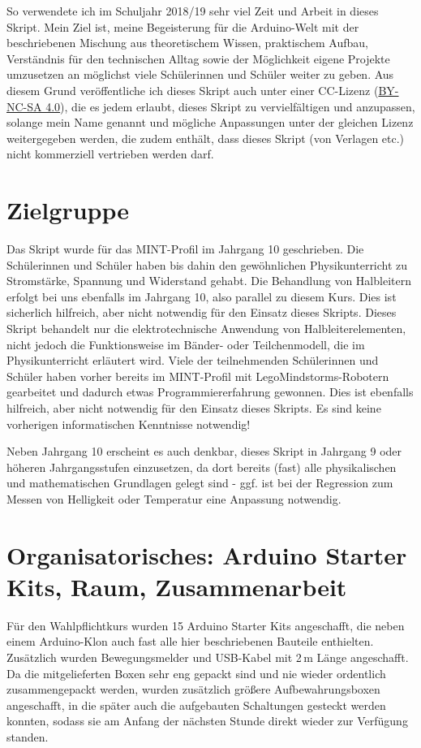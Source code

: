 So verwendete ich im Schuljahr 2018/19 sehr viel Zeit und Arbeit in dieses Skript. Mein Ziel ist, meine Begeisterung für die Arduino-Welt mit der beschriebenen Mischung aus theoretischem Wissen, praktischem Aufbau, Verständnis für den technischen Alltag sowie der Möglichkeit eigene Projekte umzusetzen an möglichst viele Schülerinnen und Schüler weiter zu geben. Aus diesem Grund veröffentliche ich dieses Skript auch unter einer CC-Lizenz (\href{https://creativecommons.org/licenses/by-nc-sa/4.0/deed.de}{BY-NC-SA 4.0}), die es jedem erlaubt, dieses Skript zu vervielfältigen und anzupassen, solange mein Name genannt und mögliche Anpassungen unter der gleichen Lizenz weitergegeben werden, die zudem enthält, dass dieses Skript (von Verlagen etc.) nicht kommerziell vertrieben werden darf.

\section{Zielgruppe}

Das Skript wurde für das MINT-Profil im Jahrgang 10 geschrieben. Die Schülerinnen und Schüler haben bis dahin den gewöhnlichen Physikunterricht zu Stromstärke, Spannung und Widerstand gehabt. Die Behandlung von Halbleitern erfolgt bei uns ebenfalls im Jahrgang 10, also parallel zu diesem Kurs. Dies ist sicherlich hilfreich, aber nicht notwendig für den Einsatz dieses Skripts. Dieses Skript behandelt nur die elektrotechnische Anwendung von Halbleiterelementen, nicht jedoch die Funktionsweise im Bänder- oder Teilchenmodell, die im Physikunterricht erläutert wird. Viele der teilnehmenden Schülerinnen und Schüler haben vorher bereits im MINT-Profil mit LegoMindstorms-Robotern gearbeitet und dadurch etwas Programmiererfahrung gewonnen. Dies ist ebenfalls hilfreich, aber nicht notwendig für den Einsatz dieses Skripts. Es sind keine vorherigen informatischen Kenntnisse notwendig!

Neben Jahrgang 10 erscheint es auch denkbar, dieses Skript in Jahrgang 9 oder höheren Jahrgangsstufen einzusetzen, da dort bereits (fast) alle physikalischen und mathematischen Grundlagen gelegt sind - ggf. ist bei der Regression zum Messen von Helligkeit oder Temperatur eine Anpassung notwendig.

\section{Organisatorisches: Arduino Starter Kits, Raum, Zusammenarbeit}

Für den Wahlpflichtkurs wurden 15 Arduino Starter Kits angeschafft, die neben einem Arduino-Klon auch fast alle hier beschriebenen Bauteile enthielten. Zusätzlich wurden Bewegungsmelder und USB-Kabel mit 2\,m Länge angeschafft. Da die mitgelieferten Boxen sehr eng gepackt sind und nie wieder ordentlich zusammengepackt werden, wurden zusätzlich größere Aufbewahrungsboxen angeschafft, in die später auch die aufgebauten Schaltungen gesteckt werden konnten, sodass sie am Anfang der nächsten Stunde direkt wieder zur Verfügung standen.

